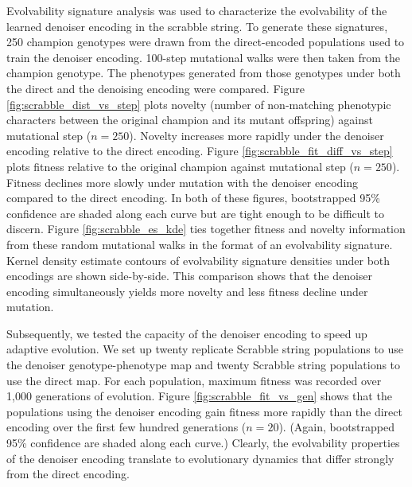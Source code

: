 Evolvability signature analysis was used to characterize the evolvability of the learned denoiser encoding in the scrabble string.
To generate these signatures, 250 champion genotypes were drawn from the direct-encoded populations used to train the denoiser encoding.
100-step mutational walks were then taken from the champion genotype.
The phenotypes generated from those genotypes under both the direct and the denoising encoding were compared.
Figure \ref{fig:scrabble_dist_vs_step} plots novelty (number of non-matching phenotypic characters between the original champion and its mutant offspring) against mutational step ($n=250$).
Novelty increases more rapidly under the denoiser encoding relative to the direct encoding.
Figure \ref{fig:scrabble_fit_diff_vs_step} plots fitness relative to the original champion against mutational step ($n=250$).
Fitness declines more slowly under mutation with the denoiser encoding compared to the direct encoding.
In both of these figures, bootstrapped 95\% confidence are shaded along each curve but are tight enough to be difficult to discern.
Figure \ref{fig:scrabble_es_kde} ties together fitness and novelty information from these random mutational walks in the format of an evolvability signature.
Kernel density estimate contours of evolvability signature densities under both encodings are shown side-by-side.
This comparison shows that the denoiser encoding simultaneously yields more novelty and less fitness decline under mutation.

Subsequently, we tested the capacity of the denoiser encoding to speed up adaptive evolution.
We set up twenty replicate Scrabble string populations to use the denoiser genotype-phenotype map and twenty Scrabble string populations to use the direct map.
For each population, maximum fitness was recorded over 1,000 generations of evolution.
Figure \ref{fig:scrabble_fit_vs_gen} shows that the populations using the denoiser encoding gain fitness more rapidly than the direct encoding over the first few hundred generations ($n=20$).
(Again, bootstrapped 95\% confidence are shaded along each curve.)
Clearly, the evolvability properties of the denoiser encoding translate to evolutionary dynamics that differ strongly from the direct encoding.

